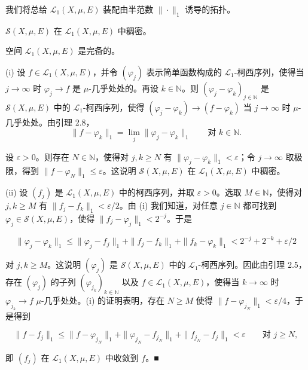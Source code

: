 我们将总给 $ \mathcal{L}_1(X,\mu,E) $ 装配由半范数 $ \|\cdot\|_1 $ 诱导的拓扑。

\begin{theorem}

\begin{subitems}
\item

$ \mathcal{S}(X,\mu,E) $ 在 $ \mathcal{L}_1(X,\mu,E) $ 中稠密。

\item

空间 $ \mathcal{L}_1(X,\mu,E) $ 是完备的。

\proofhead
(i) 设 $ f \in \mathcal{L}_1(X,\mu,E) $，并令 $ (\varphi_j) $ 表示简单函数构成的 $ \mathcal{L}_1 $-柯西序列，使得当 $ j \to \infty $ 时 $ \varphi_j \to f $ 是 $ \mu $-几乎处处的。再设 $ k \in \mathbb{N} $。则 $ (\varphi_j - \varphi_k)_{j \in \mathbb{N}} $ 是 $ \mathcal{S}(X,\mu,E) $ 中的 $ \mathcal{L}_1 $-柯西序列，使得 $ (\varphi_j - \varphi_k) \to (f - \varphi_k) $
当 $ j \to \infty $ 时 $ \mu $-几乎处处。由引理 2.8，
\[
\|f - \varphi_k\|_1 = \lim_{j} \|\varphi_j - \varphi_k\|_1 \qquad \text{对 } k \in \mathbb{N} .
\]

设 $ \varepsilon > 0 $。则存在 $ N \in \mathbb{N} $，使得对 $ j, k \ge N $ 有 $ \|\varphi_j - \varphi_k\|_1 < \varepsilon $；令 $ j \to \infty $ 取极限，得到 $ \|f - \varphi_N\|_1 \le \varepsilon $。这说明 $ \mathcal{S}(X,\mu,E) $ 在 $ \mathcal{L}_1(X,\mu,E) $ 中稠密。

\end{subitems}

(ii) 设 $ (f_j) $ 是 $ \mathcal{L}_1(X,\mu,E) $ 中的柯西序列，并取 $ \varepsilon > 0 $。选取 $ M \in \mathbb{N} $，使得对 $ j, k \ge M $ 有 $ \|f_j - f_k\|_1 < \varepsilon/2 $。由 (i) 我们知道，对任意 $ j \in \mathbb{N} $ 都可找到 $ \varphi_j \in \mathcal{S}(X,\mu,E) $，使得 $ \|f_j - \varphi_j\|_1 < 2^{-j} $。于是

\[
\|\varphi_j - \varphi_k\|_1 \le \|\varphi_j - f_j\|_1 + \|f_j - f_k\|_1 + \|f_k - \varphi_k\|_1 < 2^{-j} + 2^{-k} + \varepsilon/2
\]

对 $ j, k \ge M $。这说明 $ (\varphi_j) $ 是 $ \mathcal{S}(X,\mu,E) $ 中的 $ \mathcal{L}_1 $-柯西序列。因此由引理 2.5，存在 $ (\varphi_j) $ 的子列 $ (\varphi_{j_k})_{k \in \mathbb{N}} $ 以及 $ f \in \mathcal{L}_1(X,\mu,E) $，使得当 $ k \to \infty $ 时 $ \varphi_{j_k} \to f $ $ \mu $-几乎处处。(i) 的证明表明，存在 $ N \ge M $ 使得 $ \|f - \varphi_{j_N}\|_1 < \varepsilon/4 $，于是得到

\[
\|f - f_j\|_1 \le \|f - \varphi_{j_N}\|_1 + \|\varphi_{j_N} - f_{j_N}\|_1 + \|f_{j_N} - f_j\|_1 < \varepsilon \qquad \text{对 } j \ge N ,
\]

即 $ (f_j) $ 在 $ \mathcal{L}_1(X,\mu,E) $ 中收敛到 $ f $。\nobreak\hspace{0.35em}■

\end{theorem}


